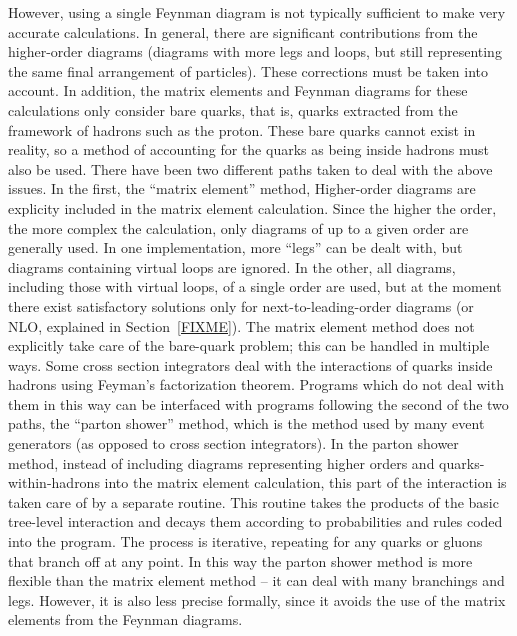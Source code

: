 However, using a single Feynman diagram is not typically 
sufficient to make very accurate calculations.  
In general, there are significant contributions from 
the higher-order diagrams  
(diagrams with more legs and loops, 
but still representing the same final arrangement of particles). 
These corrections must be taken into account.  
In addition, the matrix elements and Feynman diagrams 
for these calculations only consider bare quarks, 
that is, quarks extracted from the framework of 
hadrons such as the proton.  
These bare quarks cannot exist in reality, 
so a method of accounting for the quarks 
as being inside hadrons must also be used.  
There have been two different paths taken to deal %
with the above issues.  
In the first, the ``matrix element'' method, 
Higher-order diagrams are explicity included in 
the matrix element calculation.  
Since the higher the order, 
the more complex the calculation, 
only diagrams of up to a given order are 
generally used.  
In one implementation, more ``legs'' can be dealt with, 
but diagrams containing virtual loops are ignored.  %
In the other, all diagrams, including those with virtual 
loops, of a single order are used, 
but at the moment there exist satisfactory solutions 
only for next-to-leading-order diagrams 
(or NLO, explained in Section~\ref{FIXME}).  
The matrix element method does not explicitly 
take care of the bare-quark problem; %
this can be handled in multiple ways.  
Some cross section integrators deal with the interactions of %
quarks inside hadrons using Feyman's factorization theorem. 
Programs which do not deal with them in this way 
can be interfaced with programs following the 
second of the two paths, %
the ``parton shower'' method, 
which is the method used by many event generators 
(as opposed to cross section integrators).  
In the parton shower method, 
instead of including diagrams representing 
higher orders and quarks-within-hadrons 
into the matrix element calculation, 
this part of the interaction is taken care of 
by a separate routine.  
This routine takes the products of the 
basic tree-level interaction 
and decays them according to 
probabilities and rules coded into the program.  
The process is iterative, 
repeating for any quarks or gluons that 
branch off at any point.  
In this way the parton shower method 
is more flexible than the matrix element method -- 
it can deal with many branchings and legs. 
However, it is also less precise formally, 
since it avoids the use of the matrix elements 
from the Feynman diagrams.  

